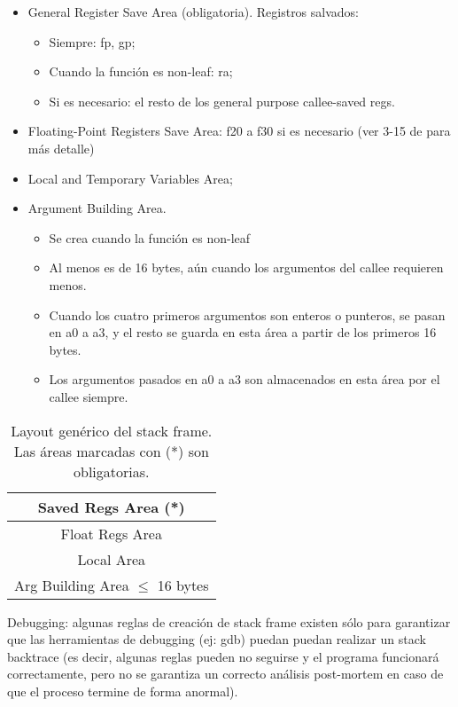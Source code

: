 \begin{itemize}
 \item General Register Save Area (obligatoria). Registros salvados:
 \begin{itemize}
  \item Siempre: fp, gp;
  \item Cuando la función es non-leaf: ra;
  \item Si es necesario: el resto de los general purpose callee-saved regs.
 \end{itemize}
\item Floating-Point Registers Save Area: f20 a f30 si es necesario (ver 3-15 de \cite{abi} para más detalle)
\item Local and Temporary Variables Area;
\item Argument Building Area.
\begin{itemize}
 \item Se crea cuando la función es non-leaf
 \item Al menos es de 16 bytes, aún cuando los argumentos del callee
requieren menos.
 \item Cuando los cuatro primeros argumentos son enteros o punteros,
se pasan en a0 a a3, y el resto se guarda en esta área a partir de
los primeros 16 bytes.
 \item Los argumentos pasados en a0 a a3 son almacenados en esta área
por el callee siempre.
\end{itemize}
\end{itemize}

\begin{table}[!h]
\begin{center}
\begin{tabular}{|c|}\hline
Saved Regs Area (*)\\\hline
Float Regs Area\\\hline
Local Area\\\hline
Arg Building Area
$\leq$ 16 bytes\\\hline
\end{tabular}
\caption{Layout genérico del stack frame. Las áreas marcadas con (*) son obligatorias.}
\end{center}
\end{table}


Debugging: algunas reglas de creación de stack frame existen sólo para
garantizar que las herramientas de debugging (ej: gdb) puedan puedan
realizar un stack backtrace (es decir, algunas reglas pueden no seguirse y
el programa funcionará correctamente, pero no se garantiza un correcto
análisis post-mortem en caso de que el proceso termine de forma anormal).

